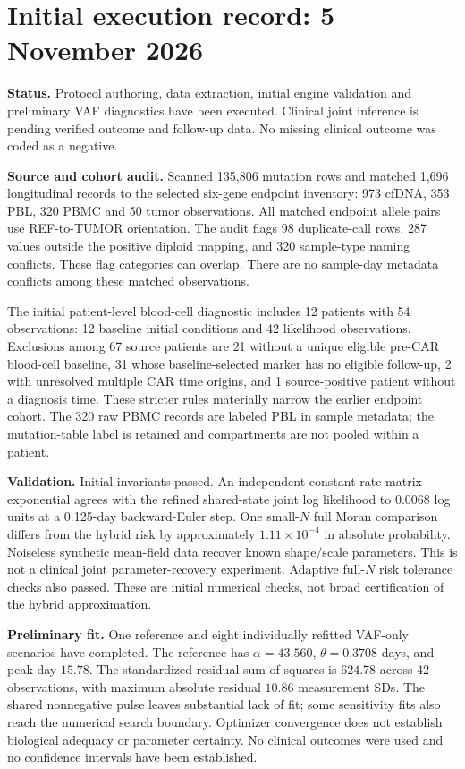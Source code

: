 \clearpage
\appendix
\section{Initial execution record: 5 November 2026}
\textbf{Status.} Protocol authoring, data extraction, initial engine validation and preliminary VAF diagnostics have been executed. Clinical joint inference is pending verified outcome and follow-up data. No missing clinical outcome was coded as a negative.

\textbf{Source and cohort audit.} Scanned 135,806 mutation rows and matched 1,696 longitudinal records to the selected six-gene endpoint inventory: 973 cfDNA, 353 PBL, 320 PBMC and 50 tumor observations. All matched endpoint allele pairs use REF-to-TUMOR orientation. The audit flags 98 duplicate-call rows, 287 values outside the positive diploid mapping, and 320 sample-type naming conflicts. These flag categories can overlap. There are no sample-day metadata conflicts among these matched observations.

The initial patient-level blood-cell diagnostic includes 12 patients with 54 observations: 12 baseline initial conditions and 42 likelihood observations. Exclusions among 67 source patients are 21 without a unique eligible pre-CAR blood-cell baseline, 31 whose baseline-selected marker has no eligible follow-up, 2 with unresolved multiple CAR time origins, and 1 source-positive patient without a diagnosis time. These stricter rules materially narrow the earlier endpoint cohort. The 320 raw PBMC records are labeled PBL in sample metadata; the mutation-table label is retained and compartments are not pooled within a patient.

\textbf{Validation.} Initial invariants passed. An independent constant-rate matrix exponential agrees with the refined shared-state joint log likelihood to 0.0068 log units at a 0.125-day backward-Euler step. One small-$N$ full Moran comparison differs from the hybrid risk by approximately $1.11\times10^{-4}$ in absolute probability. Noiseless synthetic mean-field data recover known shape/scale parameters. This is not a clinical joint parameter-recovery experiment. Adaptive full-$N$ risk tolerance checks also passed. These are initial numerical checks, not broad certification of the hybrid approximation.

\textbf{Preliminary fit.} One reference and eight individually refitted VAF-only scenarios have completed. The reference has
$\alpha=43.560$, $\theta=0.3708$ days, and peak day $15.78$. The standardized residual sum of squares is $624.78$ across 42 observations, with maximum absolute residual $10.86$ measurement SDs. The shared nonnegative pulse leaves substantial lack of fit; some sensitivity fits also reach the numerical search boundary. Optimizer convergence does not establish biological adequacy or parameter certainty. No clinical outcomes were used and no confidence intervals have been established.


